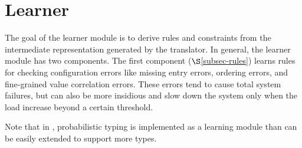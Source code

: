 \section{Learner}
\label{sec-learn}


The goal of the learner module is to derive rules and constraints from
the intermediate representation generated by the translator.
In general, the learner module has two components.
The first component ($\S$\ref{subsec-rules}) 
learns rules for checking configuration errors like
missing entry errors, ordering errors, and fine-grained value correlation errors. 
These errors tend to cause total system failures, but can also be more insidious and slow down the system only when the load increase beyond a certain threshold.

Note that in \app, probabilistic typing is implemented as a learning module than can be easily extended to support more types. 
